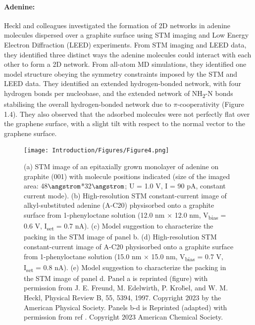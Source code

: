 \paragraph{Adenine:} Heckl and colleagues investigated the formation of 2D networks in adenine molecules dispersed over a graphite surface using STM imaging and Low Energy Electron Diffraction (LEED) experiments.\supercite{freund_structure_1997} From STM imaging and LEED data, they identified three distinct ways the adenine molecules could interact with each other to form a 2D network. From all-atom MD simulations, they identified one model structure obeying the symmetry constraints imposed by the STM and LEED data. They identified an extended hydrogen-bonded network, with four hydrogen bonds per nucleobase, and the extended network of NH\textsubscript{2}-N bonds stabilising the overall hydrogen-bonded network due to $\pi$-cooperativity (Figure 1.4). They also observed that the adsorbed molecules were not perfectly flat over the graphene surface, with a slight tilt with respect to the normal vector to the graphene surface.
\begin{figure}
    \centering
    \texttt{[image: Introduction/Figures/Figure4.png]}
    \caption[Representative structures for adenine self-assemblies over graphene]{(a) STM image of an epitaxially grown monolayer of adenine on graphite (001) with molecule positions indicated (size of the imaged area: 48$\angstrom$*32$\angstrom$; U = 1.0 V, I = 90 pA, constant current mode). (b) High-resolution STM constant-current image of alkyl-substituted adenine (A-C20) physisorbed onto a graphite surface from 1-phenyloctane solution (12.0 nm × 12.0 nm, V\textsubscript{bias} = 0.6 V, I\textsubscript{set} = 0.7 nA). (c) Model suggestion to characterize the packing in the STM image of panel b. (d) High-resolution STM constant-current image of A-C20 physisorbed onto a graphite surface from 1-phenyloctane solution (15.0 nm × 15.0 nm, V\textsubscript{bias} = 0.7 V, I\textsubscript{set} = 0.8 nA). (e) Model suggestion to characterize the packing in the STM image of panel d. Panel a is reprinted (figure) with permission from J. E. Freund, M. Edelwirth, P. Kro\"{b}el, and W. M. Heckl, Physical Review B, 55, 5394, 1997.\supercite{freund_structure_1997} Copyright 2023 by the American Physical Society. Panels b-d is Reprinted (adapted) with permission from ref \supercite{mu_temperature-dependent_2013}. Copyright 2023 American Chemical Society. }
    \label{fig:enter-label}
\end{figure}

